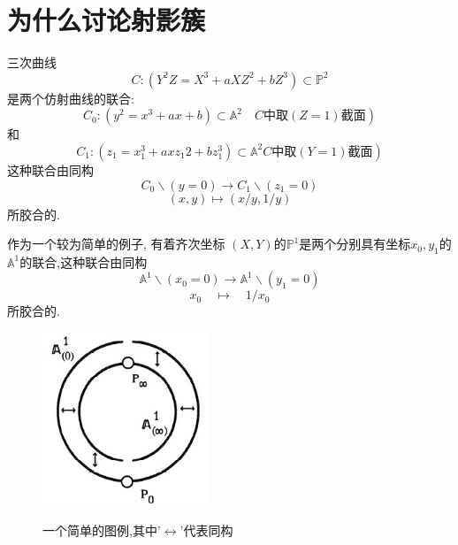\documentclass[UTF8]{book}
\begin{document}
	\section{为什么讨论射影簇}
		三次曲线
		\begin{equation*}
		C :\left( Y ^{2} Z = X ^{3}+ aXZ ^{2}+ bZ ^{3}\right) \subset \mathbb{P} ^{2}
		\end{equation*}
		是两个仿射曲线的联合:
		\begin{equation*}
		\left. C _{0}:\left( y ^{2}= x ^{3}+ ax + b \right) \subset \mathbb{A} ^{2} \quad  C \text{中取} (Z = 1) \text{截面}\right)
		\end{equation*}
		和
		\begin{equation*}
		\left. C _{1}:\left( z _{1}= x _{1}^{3}+ axz _{1} 2+ bz _{1}^{3}\right) \subset \mathbb{A} ^{2}   C \text{中取} (Y = 1) \text{截面}\right)
		\end{equation*}
		这种联合由同构
		\begin{equation*}
		C _{0} \backslash( y =0) \longrightarrow  C _{1} \backslash\left( z _{1}=0\right)
		\end{equation*}
		\begin{equation*}
		( x , y ) \mapsto( x / y , 1 / y )
		\end{equation*}
		所胶合的.
		
		
		作为一个较为简单的例子, 有着齐次坐标 $( X , Y )$的$\mathbb{P}^{1}$是两个分别具有坐标$ x_{0},y_{1} $的 $\mathbb{A}^{1}$的联合,这种联合由同构
		\begin{equation*}
		\mathbb{A}^{1} \backslash\left(x_{0}=0\right)\rightarrow \mathbb{A}^{1} \backslash\left(y_{1}=0\right)
		\end{equation*}
		\begin{equation*}
		x _{0} \quad \mapsto \quad 1 / x _{0}
		\end{equation*}
		所胶合的.
		
		
		\begin{figure}[h]
			\centering
			\includegraphics[width=5cm]{50.jpg}\\
			\caption*{一个简单的图例,其中'$ \leftrightarrow $'代表同构}
		\end{figure}
	
\end{document}
